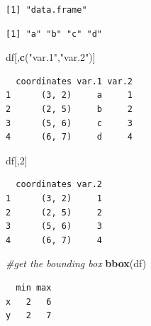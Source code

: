\documentclass[
]{krantz}
\makeatletter
\newenvironment{Shaded}{\begin{snugshade}}{\end{snugshade}}
\newcommand{\CommentTok}[1]{\textcolor[rgb]{0.37,0.37,0.37}{\textit{#1}}}
\newcommand{\DecValTok}[1]{\textcolor[rgb]{0.06,0.06,0.06}{#1}}
\newcommand{\FloatTok}[1]{\textcolor[rgb]{0.06,0.06,0.06}{#1}}
\newcommand{\KeywordTok}[1]{\textcolor[rgb]{0.27,0.27,0.27}{\textbf{#1}}}
\newcommand{\NormalTok}[1]{#1}
\newcommand{\OperatorTok}[1]{\textcolor[rgb]{0.43,0.43,0.43}{\textbf{#1}}}
\newcommand{\StringTok}[1]{\textcolor[rgb]{0.5,0.5,0.5}{#1}}
\newenvironment{kframe}{%
\medskip{}
\setlength{\fboxsep}{.8em}
 \def\at@end@of@kframe{}%
 \ifinner\ifhmode%
  \def\at@end@of@kframe{\end{minipage}}%
  \begin{minipage}{\columnwidth}%
 \fi\fi%
 \def\FrameCommand##1{\hskip\@totalleftmargin \hskip-\fboxsep
 \colorbox{shadecolor}{##1}\hskip-\fboxsep
     \hskip-\linewidth \hskip-\@totalleftmargin \hskip\columnwidth}%
 \MakeFramed {\advance\hsize-\width
   \@totalleftmargin\z@ \linewidth\hsize
   \@setminipage}}%
 {\par\unskip\endMakeFramed%
 \at@end@of@kframe}
\renewenvironment{Shaded}{\begin{kframe}}{\end{kframe}}
\makeatother
\begin{document}
\begin{verbatim}
[1] "data.frame"
\end{verbatim}

\begin{Shaded}
\end{Shaded}

\begin{verbatim}
[1] "a" "b" "c" "d"
\end{verbatim}

\begin{Shaded}
\begin{Highlighting}[]
\NormalTok{df[,}\KeywordTok{c}\NormalTok{(}\StringTok{"var.1"}\NormalTok{,}\StringTok{"var.2"}\NormalTok{)]}
\end{Highlighting}
\end{Shaded}

\begin{verbatim}
  coordinates var.1 var.2
1      (3, 2)     a     1
2      (2, 5)     b     2
3      (5, 6)     c     3
4      (6, 7)     d     4
\end{verbatim}

\begin{Shaded}
\begin{Highlighting}[]
\NormalTok{df[,}\DecValTok{2}\NormalTok{]}
\end{Highlighting}
\end{Shaded}

\begin{verbatim}
  coordinates var.2
1      (3, 2)     1
2      (2, 5)     2
3      (5, 6)     3
4      (6, 7)     4
\end{verbatim}

\begin{Shaded}
\begin{Highlighting}[]
\CommentTok{\#get the bounding box}
\KeywordTok{bbox}\NormalTok{(df)}
\end{Highlighting}
\end{Shaded}

\begin{verbatim}
  min max
x   2   6
y   2   7
\end{verbatim}
\end{document}
